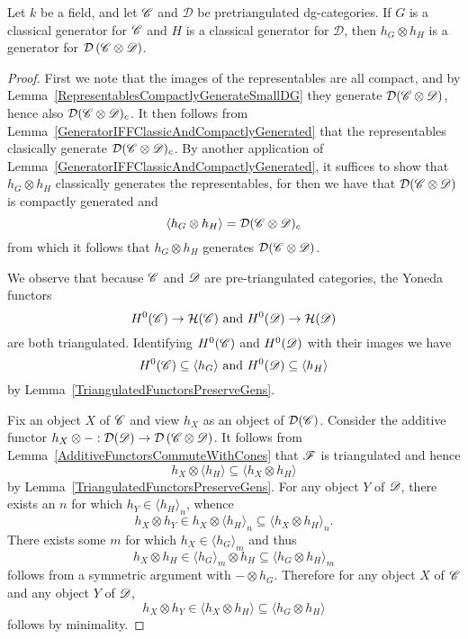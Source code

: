 \documentclass[dissertation.tex]{subfiles}
\begin{document}
\begin{thm}
  Let $k$ be a field, and let $\mathscr{C}$ and $\mathscr{D}$ be pretriangulated dg-categories.
  If $G$ is a classical generator for $\mathscr{C}$ and $H$ is a classical generator for $\mathscr{D}$, then $h_G \otimes h_H$ is a generator for $\mathcal{D}\left(\mathscr{C} \otimes \mathscr{D}\right)$.
  
  \begin{proof}
    First we note that the images of the representables are all compact, and by Lemma~\ref{RepresentablesCompactlyGenerateSmallDG} they generate $\mathcal{D}(\mathscr{C} \otimes \mathscr{D})$, hence also $\mathcal{D}(\mathscr{C} \otimes \mathscr{D})_c$.
    It then follows from Lemma~\ref{GeneratorIFFClassicAndCompactlyGenerated} that the representables clasically generate $\mathcal{D}(\mathscr{C} \otimes \mathscr{D})_c$.
    By another application of Lemma~\ref{GeneratorIFFClassicAndCompactlyGenerated}, it suffices to show that $h_G \otimes h_H$ classically generates the representables, for then we have that $\mathcal{D}(\mathscr{C} \otimes \mathscr{D})$ is compactly generated and 
    $$\langle h_G \otimes h_H \rangle = \mathcal{D}(\mathscr{C} \otimes \mathscr{D})_c$$
    from which it follows that $h_G \otimes h_H$ generates $\mathcal{D}(\mathscr{C} \otimes \mathscr{D})$.
    
    We observe that because $\mathscr{C}$ and $\mathscr{D}$ are pre-triangulated categories, the Yoneda functors
    $$H^0(\mathscr{C}) \to \mathcal{H}(\mathscr{C})\ \text{and}\ H^0(\mathscr{D}) \to \mathcal{H}(\mathscr{D})$$
    are both triangulated.
    Identifying $H^0(\mathscr{C})$ and $H^0(\mathscr{D})$ with their images we have
    $$H^0(\CC) \subseteq \langle h_G \rangle\ \text{and}\ H^0(\D) \subseteq \langle h_H \rangle$$
    by Lemma~\ref{TriangulatedFunctorsPreserveGens}.
    
    Fix an object $X$ of $\mathscr{C}$ and view $h_X$ as an object of $\mathcal{D}(\mathscr{C})$.
    Consider the additive functor $h_X \otimes -: \mathcal{D}(\mathscr{D}) \to \mathcal{D}\left(\mathscr{C} \otimes \mathscr{D}\right)$. %
    It follows from Lemma~\ref{AdditiveFunctorsCommuteWithCones} that $\mathscr{F}$ is triangulated and hence 
    $$h_X \otimes \langle h_H \rangle \subseteq \langle h_X \otimes h_H \rangle$$
    by Lemma~\ref{TriangulatedFunctorsPreserveGens}.
    For any object $Y$ of $\mathscr{D}$, there exists an $n$ for which $h_Y \in \langle h_H \rangle_n$, whence
    $$h_X \otimes h_Y \in h_X \otimes \langle h_H\rangle_n \subseteq \langle h_X \otimes h_H\rangle_n.$$
    There exists some $m$ for which $h_X \in \langle h_G \rangle_m$ and thus
    $$h_X \otimes h_H \in \langle h_G \rangle_m \otimes h_H \subseteq \langle h_G \otimes h_H \rangle_m$$
    follows from a symmetric argument with $- \otimes h_G$.
    Therefore for any object $X$ of $\mathscr{C}$ and any object $Y$ of $\mathscr{D}$,
    $$h_X \otimes h_Y \in \langle h_X \otimes h_H \rangle \subseteq \langle h_G \otimes h_H\rangle$$
    follows by minimality.
  \end{proof}
\end{thm}
\end{document}
